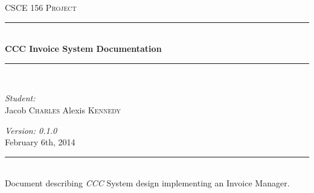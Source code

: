 \documentclass[]{article}
\newcommand{\HRule}{\rule{\linewidth}{0.5mm}}
\begin{document}
	\begin{titlepage}
		\begin{center}


		\textsc{\LARGE CSCE 156 Project}\\[1.5 cm]
		
		\HRule \\[0.5cm]
		
		{ \huge \bfseries CCC Invoice System Documentation \\[0.5cm] }

		\HRule \\[1.5cm]

			\begin{minipage}{0.5\textwidth}
				\begin{flushleft} \large
				
				\emph{Student:}\\
				Jacob \textsc{Charles}\linebreak
				Alexis \textsc{Kennedy}
				
				\end{flushleft}
			\end{minipage}
			\begin{minipage}{0.4\textwidth}
				\begin{flushright}\large

					\emph{Version: 0.1.0} \\
					February 6th, 2014
				
				\end{flushright}
			\end{minipage}

		\vfill
		\HRule \\[0.2cm]
		{\large Document describing \emph{CCC} System design implementing an 
		\linebreak \linebreak Invoice Manager.}

		\end{center}
	\end{titlepage}

	
\end{document}
